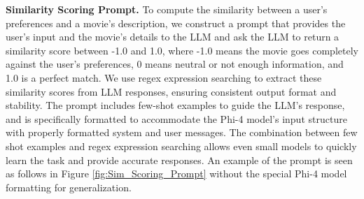 \documentclass[sigconf]{acmart}
\begin{document}
\noindent
\textbf{Similarity Scoring Prompt.}
To compute the similarity between a user's preferences and a movie's description, we construct a prompt that provides the user's input and the movie's details to the LLM and ask the LLM to return a similarity score between -1.0 and 1.0, where -1.0 means the movie goes completely against the user's preferences, 0 means neutral or not enough information, and 1.0 is a perfect match. We use regex expression searching to extract these similarity scores from LLM responses, ensuring consistent output format and stability. The prompt includes few-shot examples to guide the LLM's response, and is specifically formatted to accommodate the Phi-4 model's input structure with properly formatted system and user messages. The combination between few shot examples and regex expression searching allows even small models to quickly learn the task and provide accurate responses. An example of the prompt is seen as follows in Figure \ref{fig:Sim_Scoring_Prompt} without the special Phi-4 model formatting for generalization. 
\end{document}
